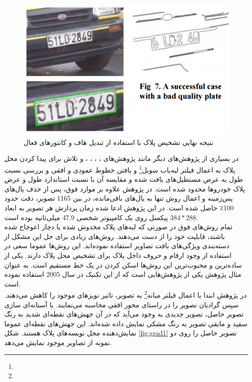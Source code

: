 \documentclass[12pt,a4paper]{article}
\newcommand{\enfootnote}[1]{\footnote{\lr{#1}}}
\begin{document}
\begin{figure}[h]
\centering
\includegraphics[scale=0.5]{Imgs/succHT.png}
\caption{نتیجه نهایی تشخیص پلاک با استفاده از تبدیل هاف و کانتورهای فعال \cite{duan2004combining}}
\label{fig:succHF}
\end{figure}

در بسیاری از پژوهش‌های دیگر مانند پژوهش‌های
\cite{sanyuan2004car}
،
\cite{sarfraz2003saudi}
،
\cite{zheng2005efficient}
،
\cite{kanayama1991development}
،
\cite{kamat1995efficient}
و
\cite{busch1998feature}
تلاش برای پیدا کردن محل پلاک به اعمال فیلتر لبه‌یاب سوبل\enfootnote{Sobel} و یافتن خطوط عمودی و افقی و بررسی نسبت طول به عرض مستطیل‌های یافت شده و مقایسه آن با نسبت استاندارد طول و عرض پلاک‌ خودروها محدود شده است. در پژوهش \cite{zheng2005efficient} علاوه بر موارد فوق، پس از حذف یال‌های پس‌زمینه و اعمال روش تنها به یال‌های باقی‌مانده، در بین 1165 تصویر، دقت حدود 100٪ حاصل شده است. در این پژوهش ادعا شده زمان پردازش هر تصویر به ابعاد $384 * 288$ پیکسل روی یک کامپیوتر شخصی 47.9 میلی‌ثانیه بوده است.
\\
تمام روش‌های فوق در صورتی که لبه‌های پلاک مخدوش شده یا دچار اعوجاج شده باشند، قابلیت خود را از دست می‌دهند.  روش‌های زیادی برای حل این مشکل از دسته‌بندی ویژگی‌های بافت تصاویر استفاده نموده‌اند. این روش‌ها عموما سعی در استفاده از وجود ارقام و حروف داخل پلاک برای تشخیص محل پلاک دارند. یکی از ساده‌ترین و محبوب‌ترین این روش‌ها اسکن کردن در یک خط مستقیم است. به عنوان مثال پژوهش‌ \cite{xu2005new} یکی از پژوهش‌هایی است که از این تکنیک در سال 2005 استفاده نموده است.
\\
در پژوهش \cite{xu2005new} ابتدا با اعمال فیلتر میانه\enfootnote{Median Filter} به تصویر، تاثیر نویز‌های موجود را کاهش می‌دهند. سپس گرادیان تصویر را در راستای محور افقی محاسبه می‌نمایند. با آستانه‌ای سازی تصویر حاصل، تصویر جدیدی به وجود می‌آید که در آن جهش‌های نقطه‌ای شدید به رنگ سفید و مابقی تصویر به رنگ مشکی نمایش داده شده‌اند. این جهش‌های نقطه‌ای عموما نمایش‌دهنده محل نویسه‌های پلاک هستند. شکل \ref{fig:grad1} تصویر حاصل را روی دو نمونه از تصاویر موجود نمایش می‌دهد. 
\end{document}
